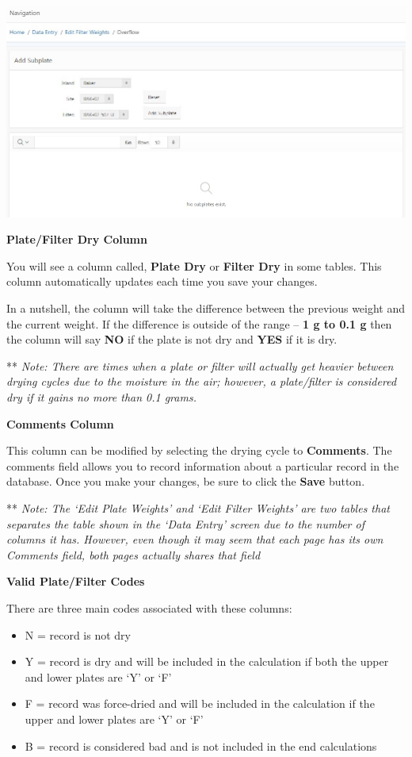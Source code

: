 \documentclass[
]{book}
\providecommand{\tightlist}{%
  \setlength{\itemsep}{0pt}\setlength{\parskip}{0pt}}
\begin{document}
\includegraphics{images/Data6.jpg}

\textbf{Plate/Filter Dry Column}

You will see a column called, \textbf{Plate Dry} or \textbf{Filter Dry} in some tables. This column automatically updates each time you save your changes.

In a nutshell, the column will take the difference between the previous weight and the current weight. If the difference is outside of the range -- \textbf{1 g to 0.1 g} then the column will say \textbf{NO} if the plate is not dry and \textbf{YES} if it is dry.

** \emph{Note: There are times when a plate or filter will actually get heavier between drying cycles due to the moisture in the air; however, a plate/filter is considered dry if it gains no more than 0.1 grams.}

\textbf{Comments Column}

This column can be modified by selecting the drying cycle to \textbf{Comments}. The comments field allows you to record information about a particular record in the database. Once you make your changes, be sure to click the \textbf{Save} button.

** \emph{Note: The `Edit Plate Weights' and `Edit Filter Weights' are two tables that separates the table shown in the `Data Entry' screen due to the number of columns it has. However, even though it may seem that each page has its own Comments field, both pages actually shares that field}

\textbf{Valid Plate/Filter Codes}

There are three main codes associated with these columns:

\begin{itemize}
\tightlist
\item
  N = record is not dry\\
\item
  Y = record is dry and will be included in the calculation if both the upper and lower plates are `Y' or `F'\\
\item
  F = record was force-dried and will be included in the calculation if the upper and lower plates are `Y' or `F'\\
\item
  B = record is considered bad and is not included in the end calculations
\end{itemize}
\end{document}
